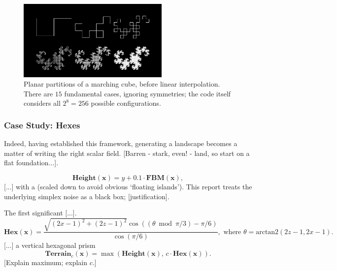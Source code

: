 \documentclass[a4paper, 11pt]{article}
\begin{document}
\begin{flushleft}
\vspace{10pt}\noindent
\begin{figure}[h]
\centering
\includegraphics[width=0.66\textwidth]{Dragon Curves}
\caption{Planar partitions of a marching cube, before linear interpolation. There are $15$ fundamental cases, ignoring symmetries; the code itself considers all $2^8 = 256$ possible configurations.}
\label{Interpolated Marching Squares}
\end{figure}

\newpage
\subsubsection{Case Study: Hexes}

Indeed, having established this framework, generating a landscape becomes a matter of writing the right scalar field. [Barren - stark, even! - land, so start on a flat foundation...]. %

$$\textbf{Height}(\mathbf{x}) = y + 0.1\cdot\textbf{FBM}(\mathbf{x}),$$
[...] with a (scaled down to avoid obvious `floating islands'). This report treats the underlying simplex noise as a black box; [justification].

\vspace{5pt}\noindent
The first significant [...].
$$\textbf{Hex}(\mathbf{x}) = \frac{\sqrt{(2x-1)^2+(2z-1)^2}\cos\left((\theta\bmod\pi/3)-\pi/6\right)}{\cos\left(\pi/6\right)}, \,\, \textrm{where} \,\, \theta = \textrm{arctan2}\left(2z-1, 2x-1\right).$$
[...] a vertical hexagonal prism
$$\textbf{Terrain}_c(\mathbf{x}) = \max\left(\textbf{Height}(\mathbf{x}), \, c\cdot\textbf{Hex}(\mathbf{x})\right).$$
[Explain maximum; explain $c$.]%

\vspace{5pt} 


\end{flushleft}
\end{document}
